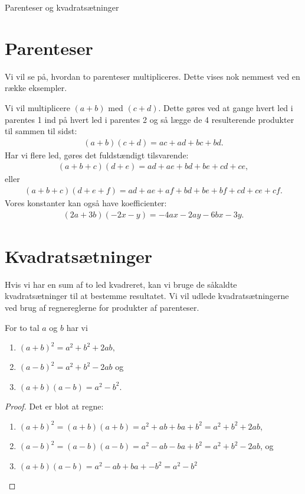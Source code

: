 
\begin{center}
\Huge
Parenteser og kvadratsætninger
\end{center}
\section*{Parenteser}
Vi vil se på, hvordan to parenteser multipliceres. Dette vises nok nemmest ved en række eksempler.
\begin{exa}
Vi vil multiplicere $(a+b)$ med $(c+d)$. Dette gøres ved at gange hvert led i parentes 1 ind på hvert led i parentes 2 og så lægge de 4 resulterende produkter til sammen til sidst:
\begin{align*}
(a+b)(c+d) = ac+ad+bc+bd.
\end{align*}
Har vi flere led, gøres det fuldstændigt tilsvarende:
\begin{align*}
(a+b+c)(d+e) = ad+ae+bd+be+cd+ce,
\end{align*}
eller 
\begin{align*}
(a+b+c)(d+e+f) = ad+ae+af+bd+be+bf+cd+ce+cf.
\end{align*}
Vores konstanter kan også have koefficienter:
\begin{align*}
(2a+3b)(-2x-y) = -4ax-2ay-6bx-3y.
\end{align*}
\end{exa}
\section*{Kvadratsætninger}
Hvis vi har en sum af to led kvadreret, kan vi bruge de såkaldte kvadratsætninger til at bestemme resultatet. Vi vil udlede kvadratsætningerne ved brug af regnereglerne for produkter af parenteser.
\begin{setn}
For to tal $a$ og $b$ har vi
\begin{enumerate}[label=\roman*)]
\item $(a+b)^2 = a^2+b^2+2ab,$
\item $(a-b)^2 = a^2+b^2-2ab$ og 
\item $(a+b)(a-b) = a^2-b^2$.
\end{enumerate}
\end{setn}
\begin{proof}
Det er blot at regne:

\begin{enumerate}[label=$\roman*)$]
\item $(a+b)^2 = (a+b)(a+b)=a^2+ab+ba+b^2=a^2+b^2+2ab$,
\item $(a-b)^2 = (a-b)(a-b) = a^2-ab-ba+b^2 = a^2+b^2-2ab$, og
\item $(a+b)(a-b) = a^2-ab+ba+-b^2 = a^2-b^2$ 
\end{enumerate}
\end{proof}

